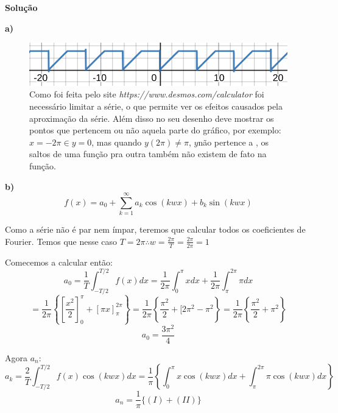 \linespread{1.5}
\textbf{Solução}

\textbf{a)}

\begin{figure}[H]
    \centering
    \includegraphics[width = 0.7\linewidth]{fig/sf8a.png}
    \caption{Como foi feita pelo site \textit{https://www.desmos.com/calculator} foi necessário limitar a série, o que permite ver os efeitos causados pela aproximação da série. Além disso no seu desenho deve mostrar os pontos que pertencem ou não aquela parte do gráfico, por exemplo: $x = -2\pi \in y=0$, mas quando $y(2\pi) \neq \pi$, $y$não pertence a , os saltos de uma função pra outra também não existem de fato na função.}
\end{figure}

\textbf{b)}
\begin{equation}
    \label{eq:Fourierserie}
    f(x) = a_0 + \sum_{k=1}^\infty a_k\cos{(kwx)} + b_k\sin{(kwx)}
\end{equation}

Como a série não é par nem ímpar, teremos que calcular todos os coeficientes de Fourier. Temos que nesse caso $T=2\pi \therefore w = \frac{2\pi}{T} = \frac{2\pi}{2\pi} = 1$ 

Comecemos a calcular então:
\begin{equation*}
    a_0 = \frac{1}{T}\int^{T/2}_{-T/2} f(x)dx = \frac{1}{2\pi}\int^\pi_0xdx + \frac{1}{2\pi} \int_\pi^{2\pi}\pi dx
\end{equation*}
\begin{equation*}
    = \frac{1}{2\pi}\left\{\left[\frac{x^2}{2}\right]^\pi_0 + [\pi x]^{2\pi}_\pi\right\} = \frac{1}{2\pi}\left\{\frac{\pi^2}{2} + [2\pi^2 - \pi^2\right\} = \frac{1}{2\pi}\left\{\frac{\pi^2}{2} + \pi^2\right\}
\end{equation*}
\begin{equation}
    \label{eq:sf8ba0}
    \boxed{a_0 = \frac{3\pi^2}{4}}
\end{equation}

Agora $a_n$:
\begin{equation*}
    a_k = \frac{2}{T}\int^{T/2}_{-T/2} f(x)\cos{(kwx)dx} = \frac{1}{\pi}\left\{\int^{\pi}_{0} x\cos{(kwx)dx} + \int^{2\pi}_\pi \pi\cos{(kwx)}dx \right\}
\end{equation*}
\begin{equation}
    \label{eq:sf8banpart}
    a_n=\frac{1}{\pi}\{(I) + (II)\}
\end{equation}


